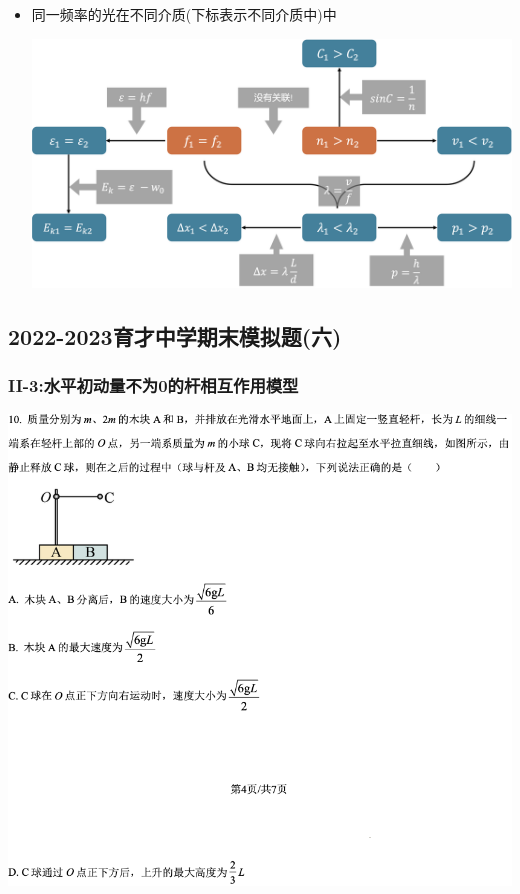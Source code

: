 \documentclass{article}
\begin{document}
\begin{itemize}
\begin{formal}
\begin{itemize}
                        \vspace*{2em}

                  \item 同一频率的光在不同介质(下标表示不同介质中)中

                        \vspace*{1em}
                        \includegraphics[width=40em,keepaspectratio]{./pictures/1.4-6.png}
              \end{itemize}
          \end{formal}
\end{itemize}

\vspace{2em}

\subsection{2022-2023育才中学期末模拟题(六)}
\subsubsection{II-3:水平初动量不为0的杆相互作用模型}

\includegraphics[width=50em,keepaspectratio]{./pictures/1.5-1.png}
\end{document}
